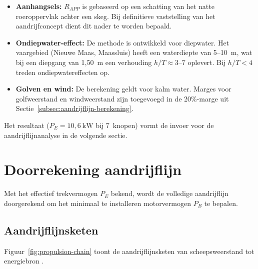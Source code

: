 \begin{itemize}
    \item \textbf{Aanhangsels:} $R_{APP}$ is gebaseerd op een schatting van het
          natte roeroppervlak achter een skeg. Bij definitieve vaststelling van
          het aandrijfconcept dient dit nader te worden bepaald.

    \item \textbf{Ondiepwater-effect:} De methode is ontwikkeld voor diepwater.
          Het vaargebied (Nieuwe Maas, Maassluis) heeft een waterdiepte van
          5--10~m, wat bij een diepgang van 1{,}50~m een verhouding
          $h/T \approx 3$--$7$ oplevert. Bij $h/T < 4$ treden
          ondiepwatereffecten op.

    \item \textbf{Golven en wind:} De berekening geldt voor kalm water. Marges
          voor golfweerstand en windweerstand zijn toegevoegd in de
          20\%-marge uit Sectie~\ref{subsec:aandrijflijn-berekening}.
\end{itemize}

Het resultaat ($P_E = 10{,}6\ \mathrm{kW}$ bij 7~knopen) vormt de invoer voor
de aandrijflijnanalyse in de volgende sectie.

\section{Doorrekening aandrijflijn}
\label{sec:aandrijflijn}

Met het effectief trekvermogen $P_E$ bekend, wordt de volledige aandrijflijn
doorgerekend om het minimaal te installeren motorvermogen $P_B$ te bepalen.

\subsection{Aandrijflijnsketen}
\label{subsec:propulsion-chain}

Figuur~\ref{fig:propulsion-chain} toont de aandrijflijnsketen van
scheepsweerstand tot energiebron \cite{Molland2011}.

